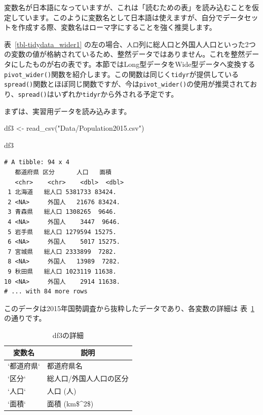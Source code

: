 \documentclass[
  a4paper,
  pandoc,
  ja=standard,
  jafont=haranoaji]{bxjsbook}
\newenvironment{Shaded}{\begin{snugshade}}{\end{snugshade}}
\newcommand{\FunctionTok}[1]{\textcolor[rgb]{0.28,0.35,0.67}{#1}}
\newcommand{\NormalTok}[1]{\textcolor[rgb]{0.00,0.48,0.65}{#1}}
\newcommand{\OtherTok}[1]{\textcolor[rgb]{0.00,0.48,0.65}{#1}}
\newcommand{\StringTok}[1]{\textcolor[rgb]{0.13,0.47,0.30}{#1}}
\begin{document}
変数名が日本語になっていますが、これは「読むための表」を読み込むことを仮定しています。このように変数名として日本語は使えますが、自分でデータセットを作成する際、変数名はローマ字にすることを強く推奨します。

表~\ref{tbl-tidydata_wider1}
の左の場合、\texttt{人口}列に総人口と外国人人口といった2つの変数の値が格納されているため、整然データではありません。これを整然データにしたものが右の表です。本節ではLong型データをWide型データへ変換する\texttt{pivot\_wider()}関数を紹介します。この関数は同じく\texttt{tidyr}が提供している\texttt{spread()}関数とほぼ同じ関数ですが、今は\texttt{pivot\_wider()}の使用が推奨されており、\texttt{spread()}はいずれか\texttt{tidyr}から外される予定です。

まずは、実習用データを読み込みます。

\begin{Shaded}
\begin{Highlighting}[numbers=left,,]
\NormalTok{df3 }\OtherTok{\textless{}{-}} \FunctionTok{read\_csv}\NormalTok{(}\StringTok{"Data/Population2015.csv"}\NormalTok{)}

\NormalTok{df3}
\end{Highlighting}
\end{Shaded}

\begin{verbatim}
# A tibble: 94 x 4
   都道府県 区分      人口   面積
   <chr>    <chr>    <dbl>  <dbl>
 1 北海道   総人口 5381733 83424.
 2 <NA>     外国人   21676 83424.
 3 青森県   総人口 1308265  9646.
 4 <NA>     外国人    3447  9646.
 5 岩手県   総人口 1279594 15275.
 6 <NA>     外国人    5017 15275.
 7 宮城県   総人口 2333899  7282.
 8 <NA>     外国人   13989  7282.
 9 秋田県   総人口 1023119 11638.
10 <NA>     外国人    2914 11638.
# ... with 84 more rows
\end{verbatim}

このデータは2015年国勢調査から抜粋したデータであり、各変数の詳細は
表~\ref{tbl-tidydata_df3_detail} の通りです。

\hypertarget{tbl-tidydata_df3_detail}{}
\begin{table}
\caption{\label{tbl-tidydata_df3_detail}df3の詳細 }

\centering
\begin{tabular}{l|l}
\hline
\multicolumn{1}{c}{変数名} & \multicolumn{1}{c}{説明}\\
\hline
`都道府県` & 都道府県名\\
\hline
`区分` & 総人口/外国人人口の区分\\
\hline
`人口` & 人口 (人)\\
\hline
`面積` & 面積 (km\$\textasciicircum{}2\$)\\
\hline
\end{tabular}
\end{table}
\end{document}
